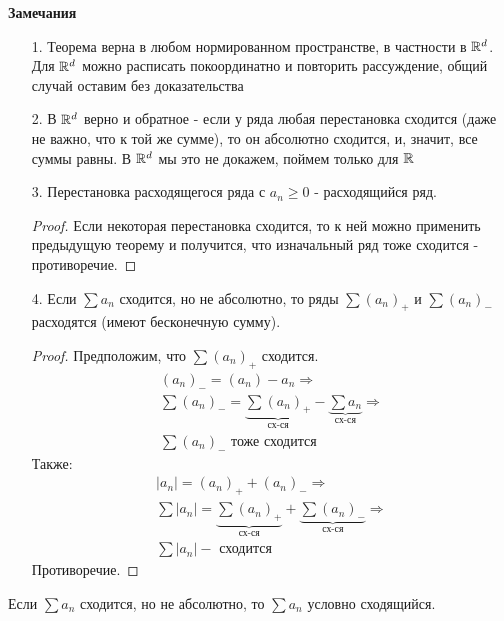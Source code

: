 \textbf{Замечания}
\begin{enumerate}
    \item[1.] Теорема верна в любом нормированном пространстве, в частности в $\mathbb{R}^d$.
    Для $\mathbb{R}^d$ можно расписать покоординатно и повторить рассуждение, общий случай оставим без доказательства
    \item[2.] В $\mathbb{R}^d$ верно и обратное - если у ряда любая перестановка сходится (даже не важно, что к той же сумме), то он абсолютно сходится,
    и, значит, все суммы равны. В $\mathbb{R}^d$ мы это не докажем, поймем только для $\mathbb{R}$
    \item[3.] Перестановка расходящегося ряда с $a_n \geq 0$ - расходящийся ряд.
    \begin{proof}
        Если некоторая перестановка сходится, то к ней можно применить предыдущую теорему и получится, что изначальный ряд тоже сходится - противоречие.
    \end{proof} 
    \item[4.] Если $\sum a_n$ сходится, но не абсолютно, то ряды $\sum (a_n)_+$ и $\sum (a_n)_-$ расходятся (имеют бесконечную сумму).  
    \begin{proof}
        Предположим, что $\sum(a_n)_+$ сходится. 
        \begin{gather*}
            (a_n)_- = (a_n) - a_n \Longrightarrow \\
            \sum (a_n)_- = \underbrace{\sum (a_n)_+}_{\text{сх-ся}} - \underbrace{\sum a_n}_{\text{сх-ся}} \Longrightarrow \\
            \sum(a_n)_- \text{ тоже сходится}
        \end{gather*}
        Также:
        \begin{gather*}
            |a_n| = (a_n)_+ + (a_n)_- \Longrightarrow \\ 
            \sum |a_n| = \underbrace{\sum (a_n)_+}_{\text{сх-ся}} + \underbrace{\sum (a_n)_-}_{\text{сх-ся}} \Longrightarrow \\
            \sum |a_n| - \text{ сходится}
        \end{gather*}
        Противоречие.
    \end{proof}
\end{enumerate}

\begin{conj}
    Если $\sum a_n$ сходится, но не абсолютно, то $\sum a_n$ условно сходящийся.
\end{conj}